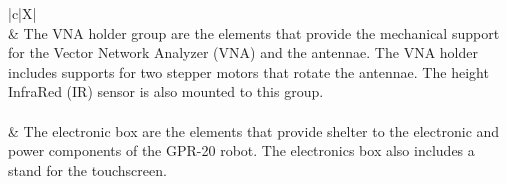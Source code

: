 \documentclass{article}
\begin{document}
\begin{xltabular}{\textwidth}{|c|X|}
     \\ \hline
     & The VNA holder group are the elements that provide the mechanical support for the Vector Network Analyzer (VNA) and the antennae. The VNA holder includes supports for two stepper motors that rotate the antennae. The height InfraRed (IR) sensor is also mounted to this group. \\ \hline
     \\ \hline
     & The electronic box are the elements that provide shelter to the electronic and power components of the GPR-20 robot. The electronics box also includes a stand for the touchscreen. \\ \hline

\end{xltabular}

\newpage
\end{document}
